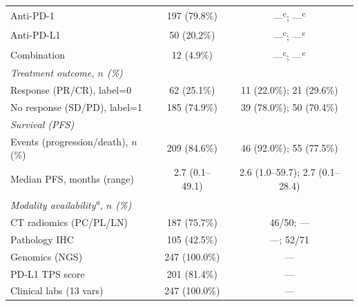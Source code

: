 \begin{table}[H]
\begin{tabular}{lcc}
\quad Anti-PD-1                 & 197 (79.8\%) & ---\textsuperscript{c}; ---\textsuperscript{c} \\
\quad Anti-PD-L1                & 50 (20.2\%) & ---\textsuperscript{c}; ---\textsuperscript{c} \\
\quad Combination               & 12 (4.9\%) & ---\textsuperscript{c}; ---\textsuperscript{c} \\
\midrule
\multicolumn{3}{l}{\textit{Treatment outcome, $n$ (\%)}} \\
\quad Response (PR/CR), label=0 & 62 (25.1\%) & 11 (22.0\%); 21 (29.6\%) \\
\quad No response (SD/PD), label=1 & 185 (74.9\%) & 39 (78.0\%); 50 (70.4\%) \\
\midrule
\multicolumn{3}{l}{\textit{Survival (PFS)}} \\
\quad Events (progression/death), $n$ (\%) & 209 (84.6\%) & 46 (92.0\%); 55 (77.5\%) \\
\quad Median PFS, months (range)            & 2.7 (0.1--49.1) & 2.6 (1.0--59.7); 2.7 (0.1--28.4) \\
\midrule
\multicolumn{3}{l}{\textit{Modality availability\textsuperscript{a}, $n$ (\%)}} \\
\quad CT radiomics (PC/PL/LN)  & 187 (75.7\%)  & 46/50; --- \\
\quad Pathology IHC             & 105 (42.5\%)  & ---; 52/71 \\
\quad Genomics (NGS)            & 247 (100.0\%)  & --- \\
\quad PD-L1 TPS score           & 201 (81.4\%) & --- \\
\quad Clinical labs (13 vars)   & 247 (100.0\%) & --- \\
\bottomrule
\end{tabular}
\end{table}
